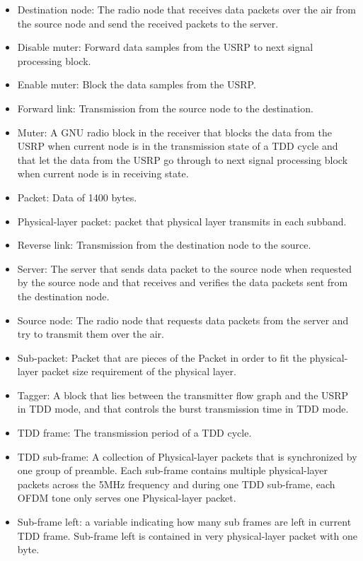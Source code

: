 \begin{itemize}
\item Destination node: The radio node that receives data packets over the air from the source node and send the received packets to the server.

\item Disable muter: Forward data samples from the USRP to next signal processing block.

\item Enable muter: Block the data samples from the USRP.

\item Forward link: Transmission from the source node to the destination.

\item Muter: A GNU radio block in the receiver that blocks the data from the USRP when current node is in the transmission state of a TDD cycle and that let the data from the USRP go through to next signal processing block when current node is in receiving state.

\item Packet: Data of 1400 bytes.

\item Physical-layer packet: packet that physical layer transmits in each subband.

\item Reverse link: Transmission from the destination node to the source.

\item Server: The server that sends data packet to the source node when requested by the source node and that receives and verifies the data packets sent from the destination node.

\item Source node: The radio node that requests data packets from the server and try to transmit them over the air.

\item Sub-packet: Packet that are pieces of the Packet in order to fit the physical-layer packet size requirement of the physical layer.

\item Tagger: A block that lies between the transmitter flow graph and the USRP in TDD mode, and that controls the burst transmission time in TDD mode.

\item TDD frame: The transmission period of a TDD cycle.

\item TDD sub-frame: A collection of Physical-layer packets that is synchronized by one group of preamble. Each sub-frame contains multiple physical-layer packets across the 5MHz frequency and during one TDD sub-frame, each OFDM tone only serves one Physical-layer packet.

\item Sub-frame left: a variable indicating how many sub frames are left in current TDD frame. Sub-frame left is contained in very physical-layer packet with one byte.
\end{itemize}
